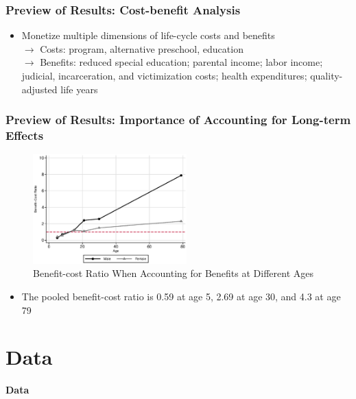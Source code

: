 \documentclass[static]{JJH-Beamer}
\begin{document}

\begin{frame}
\frametitle{Preview of Results: Cost-benefit Analysis}
	\begin{itemize}
		\item Monetize multiple dimensions of life-cycle costs and benefits \\
			$\rightarrow$ Costs: program, alternative preschool, education \\ 
			$\rightarrow$ Benefits: reduced special education; parental income; labor income; judicial, incarceration, and victimization costs; health expenditures; quality-adjusted life years 
	\end{itemize}
	\begin{center}
	\scalebox{.75}{}
	\end{center}	
\end{frame}


\begin{frame}
\frametitle{Preview of Results: Importance of Accounting for Long-term Effects}
\begin{figure}
\caption{Benefit-cost Ratio When Accounting for Benefits at Different Ages}
	\includegraphics[width=16em]{AppOutput/Sensitivity/bcr_age.eps}
\end{figure}
\begin{itemize}
	\item The pooled benefit-cost ratio is 0.59 at age 5, 2.69 at age 30, and 4.3 at age 79
\end{itemize}
\end{frame}

\section{Data}

\begin{frame}[noframenumbering]

\begin{block}{}
\begin{center}
\textbf{Data}
\end{center}
\end{block}

\end{frame}
\end{document}
